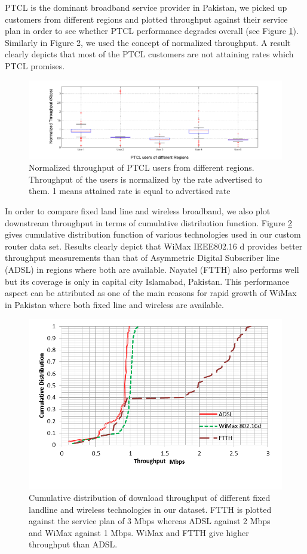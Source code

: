 \documentclass{sig-alternate-10pt}
\begin{document}
PTCL is the dominant broadband service provider in Pakistan, we picked up customers from different regions and plotted throughput against their service plan in order to see whether PTCL performance degrades overall (see Figure \ref{Fig:10}). Similarly in Figure 2, we used the concept of normalized throughput. A result clearly depicts that most of the PTCL customers are not attaining rates which PTCL promises.
\begin{figure}[h!]
\begin {center}
   \includegraphics[height=0.2 \textheight,width=0.5 \textwidth]{15.png}
   \end {center}
 \caption{Normalized throughput of PTCL users from different regions. Throughput of the users is normalized by the rate advertised to them. 1 means attained rate is equal to advertised rate} \label{Fig:10}
\end{figure}

\indent In order to compare fixed land line and wireless broadband, we also plot downstream throughput in terms of cumulative distribution function. Figure \ref{Fig:11} gives cumulative distribution function of various technologies used in our custom router data set. Results clearly depict that WiMax IEEE802.16 d provides better throughput measurements than that of Asymmetric Digital Subscriber line (ADSL) in regions where both are available. Nayatel (FTTH) also performs well but its coverage is only in capital city Islamabad, Pakistan.  This performance aspect can be attributed as one of the main reasons for rapid growth of WiMax in Pakistan \cite{28} where both fixed line and wireless are available.

\begin{figure}[h!]
\begin {center}
   \includegraphics[height=0.2 \textheight,width=0.5 \textwidth]{10.png}
   \end {center}
 \caption{Cumulative distribution of download throughput of different fixed landline and wireless technologies in our dataset. FTTH is plotted against the service plan of 3 Mbps whereas ADSL against 2 Mbps and WiMax against 1 Mbps. WiMax and FTTH give higher throughput than ADSL.} \label{Fig:11}
\end{figure}
\end{document}
